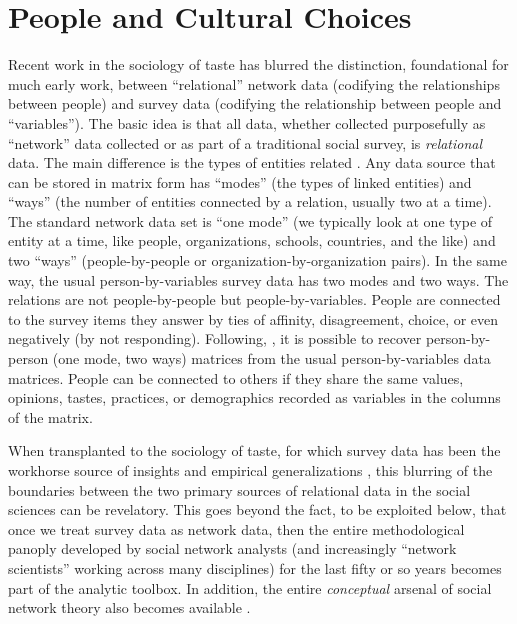 \documentclass[a4paper,12pt]{extarticle}
\begin{document}
\section{People and Cultural Choices}
Recent work in the sociology of taste has blurred the distinction, foundational for much early work, between ``relational'' network data (codifying the relationships between people) and survey data (codifying the relationship between people and ``variables''). The basic idea is that all data, whether collected purposefully as ``network'' data collected or as part of a traditional social survey, is \textit{relational} data. The main difference is the types of entities related \citep{borgatti_everett97}. Any data source that can be stored in matrix form has ``modes'' (the types of linked entities) and ``ways'' (the number of entities connected by a relation, usually two at a time). The standard network data set is ``one mode'' (we typically look at one type of entity at a time, like people, organizations, schools, countries, and the like) and two ``ways'' (people-by-people or organization-by-organization pairs). In the same way, the usual person-by-variables survey data has two modes and two ways. The relations are not people-by-people but people-by-variables. People are connected to the survey items they answer by ties of affinity, disagreement, choice, or even negatively (by not responding). Following, \citet{breiger74}, it is possible to recover person-by-person (one mode, two ways) matrices from the usual person-by-variables data matrices. People can be connected to others if they share the same values, opinions, tastes, practices, or demographics recorded as variables in the columns of the matrix. 

When transplanted to the sociology of taste, for which survey data has been the workhorse source of insights and empirical generalizations \citep{peterson_kern96, bryson96, vaneijck01,savage_gayo11}, this blurring of the boundaries between the two primary sources of relational data in the social sciences can be revelatory. This goes beyond the fact, to be exploited below, that once we treat survey data as network data, then the entire methodological panoply developed by social network analysts (and increasingly ``network scientists'' working across many disciplines) for the last fifty or so years becomes part of the analytic toolbox. In addition, the entire \textit{conceptual} arsenal of social network theory also becomes available \citep[244]{borgatti_everett97}.
\end{document}
